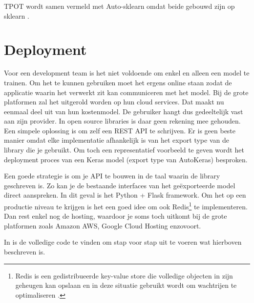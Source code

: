TPOT wordt samen vermeld met Auto-sklearn omdat beide gebouwd zijn op sklearn \autocite{Olson2016}.

\section{Deployment}
\label{sec:deployment}

Voor een development team is het niet voldoende om enkel en alleen een model te trainen. Om het te kunnen gebruiken moet het ergens online staan zodat de applicatie waarin het verwerkt zit kan communiceren met het model. Bij de grote platformen zal het uitgerold worden op hun cloud services. Dat maakt nu eenmaal deel uit van hun kostenmodel. De gebruiker hangt dus gedeeltelijk vast aan zijn provider. 
In open source libraries is daar geen rekening mee gehouden. Een simpele oplossing is om zelf een REST API te schrijven. Er is geen beste manier omdat elke implementatie afhankelijk is van het export type van de library die je gebruikt. Om toch een representatief voorbeeld te geven wordt het deployment proces van een Keras model (export type van AutoKeras) besproken. 

Een goede strategie is om je API te bouwen in de taal waarin de library geschreven is. Zo kan je de bestaande interfaces van het geëxporteerde model direct aanspreken. In dit geval is het Python + Flask framework. Om het op een productie niveau te krijgen is het een goed idee om ook Redis\footnote{Redis is een gedistribueerde key-value store die volledige objecten in zijn geheugen kan opslaan en in deze situatie gebruikt wordt om wachtrijen te optimaliseren \autocite{Adrian2018}.} te implementeren. Dan rest enkel nog de hosting, waardoor je soms toch uitkomt bij de grote platformen zoals Amazon AWS, Google Cloud Hosting enzovoort.

In \textcite{Adrian2018} is de volledige code te vinden om stap voor stap uit te voeren wat hierboven beschreven is.
